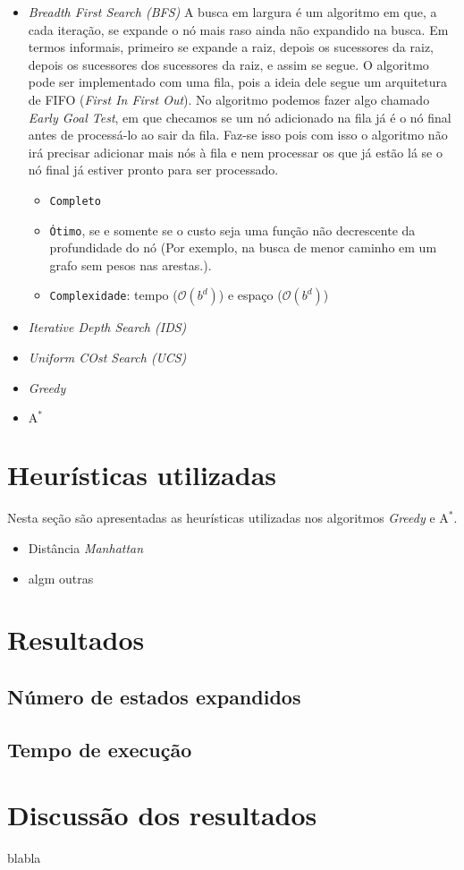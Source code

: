 \documentclass{article}
\begin{document}
\begin{itemize}
	\item \textit{Breadth First Search (BFS)}
		A busca em largura é um algoritmo em que, a cada iteração,
		se expande o nó mais raso ainda não expandido na busca. Em termos informais,
		primeiro se expande a raiz, depois os sucessores da raiz, depois os sucessores
		dos sucessores da raiz, e assim se segue. O algoritmo pode ser implementado
		com uma fila, pois a ideia dele segue um arquitetura de FIFO (\textit{First In First Out}).
		No algoritmo podemos fazer algo chamado \textit{Early Goal Test}, em que checamos se um nó adicionado na fila
		já é o nó final antes de processá-lo ao sair da fila. Faz-se isso pois com isso
		o algoritmo não irá precisar adicionar mais nós à fila e nem processar os que já estão lá se o nó final
		já estiver pronto para ser processado.

		\begin{itemize}
			\item \texttt{Completo}
			\item \texttt{Ótimo}, se e somente se o custo seja uma função
				não decrescente da profundidade do nó (Por exemplo, na busca de menor caminho em
				um grafo sem pesos nas arestas.).
			\item \texttt{Complexidade}: tempo (\(\mathcal{O}(b^d)\)) e espaço (\(\mathcal{O}(b^d)\))
		\end{itemize}

	\item \textit{Iterative Depth Search (IDS)}
	\item \textit{Uniform COst Search (UCS)}
	\item \textit{Greedy}
	\item \(\text{A}^*\)
\end{itemize}


\section{Heurísticas utilizadas}

Nesta seção são apresentadas as heurísticas utilizadas nos algoritmos \textit{Greedy} e \(\text{A}^*\).

\begin{itemize}
	\item Distância \textit{Manhattan}
	\item algm outras
\end{itemize}

\section{Resultados}

\subsection{Número de estados expandidos}

\subsection{Tempo de execução}

\section{Discussão dos resultados}

blabla
\end{document}
